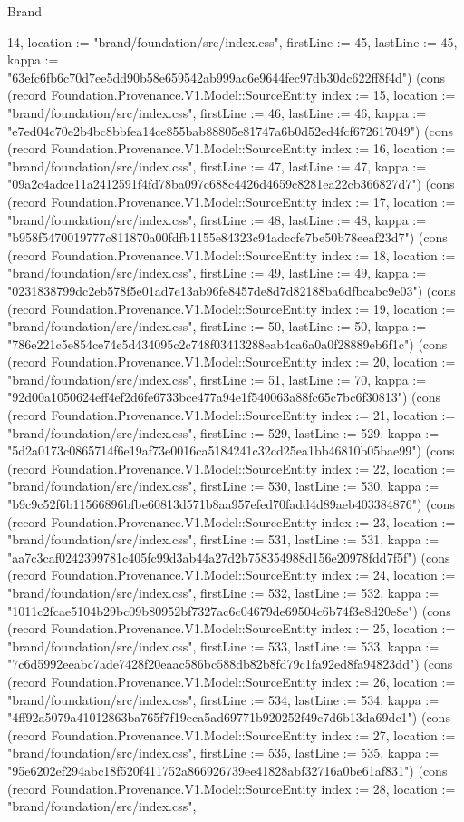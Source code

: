 \begin{lexlean}{Brand}
\begin{semanticmodule}
{14, location := "brand/foundation/src/index.css", firstLine := 45, lastLine := 45, kappa := "63efc6fb6c70d7ee5dd90b58e659542ab999ac6e9644fec97db30dc622ff8f4d"}) (cons (record Foundation.Provenance.V1.Model::SourceEntity {index := 15, location := "brand/foundation/src/index.css", firstLine := 46, lastLine := 46, kappa := "e7ed04c70e2b4bc8bbfea14ce855bab88805e81747a6b0d52ed4fcf672617049"}) (cons (record Foundation.Provenance.V1.Model::SourceEntity {index := 16, location := "brand/foundation/src/index.css", firstLine := 47, lastLine := 47, kappa := "09a2c4adce11a2412591f4fd78ba097c688c4426d4659c8281ea22cb366827d7"}) (cons (record Foundation.Provenance.V1.Model::SourceEntity {index := 17, location := "brand/foundation/src/index.css", firstLine := 48, lastLine := 48, kappa := "b958f5470019777c811870a00fdfb1155e84323c94adccfe7be50b78eeaf23d7"}) (cons (record Foundation.Provenance.V1.Model::SourceEntity {index := 18, location := "brand/foundation/src/index.css", firstLine := 49, lastLine := 49, kappa := "0231838799dc2eb578f5e01ad7e13ab96fe8457de8d7d82188ba6dfbcabc9e03"}) (cons (record Foundation.Provenance.V1.Model::SourceEntity {index := 19, location := "brand/foundation/src/index.css", firstLine := 50, lastLine := 50, kappa := "786e221c5e854ce74e5d434095c2c748f03413288eab4ca6a0a0f28889eb6f1c"}) (cons (record Foundation.Provenance.V1.Model::SourceEntity {index := 20, location := "brand/foundation/src/index.css", firstLine := 51, lastLine := 70, kappa := "92d00a1050624eff4ef2d6fe6733bce477a94e1f540063a88fc65c7bc6f30813"}) (cons (record Foundation.Provenance.V1.Model::SourceEntity {index := 21, location := "brand/foundation/src/index.css", firstLine := 529, lastLine := 529, kappa := "5d2a0173c0865714f6e19af73e0016ca5184241c32cd25ea1bb46810b05bae99"}) (cons (record Foundation.Provenance.V1.Model::SourceEntity {index := 22, location := "brand/foundation/src/index.css", firstLine := 530, lastLine := 530, kappa := "b9c9c52f6b11566896bfbe60813d571b8aa957efed70fadd4d89aeb403384876"}) (cons (record Foundation.Provenance.V1.Model::SourceEntity {index := 23, location := "brand/foundation/src/index.css", firstLine := 531, lastLine := 531, kappa := "aa7c3caf0242399781c405fc99d3ab44a27d2b758354988d156e20978fdd7f5f"}) (cons (record Foundation.Provenance.V1.Model::SourceEntity {index := 24, location := "brand/foundation/src/index.css", firstLine := 532, lastLine := 532, kappa := "1011c2fcae5104b29bc09b80952bf7327ac6c04679de69504c6b74f3e8d20e8e"}) (cons (record Foundation.Provenance.V1.Model::SourceEntity {index := 25, location := "brand/foundation/src/index.css", firstLine := 533, lastLine := 533, kappa := "7c6d5992eeabc7ade7428f20eaac586bc588db82b8fd79c1fa92ed8fa94823dd"}) (cons (record Foundation.Provenance.V1.Model::SourceEntity {index := 26, location := "brand/foundation/src/index.css", firstLine := 534, lastLine := 534, kappa := "4ff92a5079a41012863ba765f7f19eca5ad69771b920252f49c7d6b13da69dc1"}) (cons (record Foundation.Provenance.V1.Model::SourceEntity {index := 27, location := "brand/foundation/src/index.css", firstLine := 535, lastLine := 535, kappa := "95e6202ef294abc18f520f411752a866926739ee41828abf32716a0be61af831"}) (cons (record Foundation.Provenance.V1.Model::SourceEntity {index := 28, location := "brand/foundation/src/index.css", }
\end{semanticmodule}
\end{lexlean}
